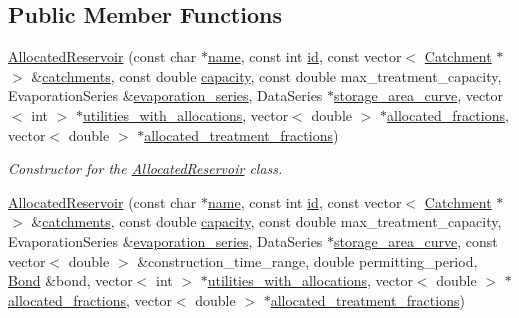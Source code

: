 \subsection*{Public Member Functions}
\begin{DoxyCompactItemize}
\item 
\mbox{\hyperlink{classAllocatedReservoir_a0b2d620a1d1fe9a9fe053269f35a9a70}{Allocated\+Reservoir}} (const char $\ast$\mbox{\hyperlink{classWaterSource_a846ea74c5b453d014f594d41fee8c765}{name}}, const int \mbox{\hyperlink{classWaterSource_a6eafe5dfefd317877d1244e8a7c6e742}{id}}, const vector$<$ \mbox{\hyperlink{classCatchment}{Catchment}} $\ast$$>$ \&\mbox{\hyperlink{classWaterSource_a8c18c34f23f8a06685c1d12f462ed830}{catchments}}, const double \mbox{\hyperlink{classWaterSource_a2ec257b415b248214a8bce7fc5267723}{capacity}}, const double max\+\_\+treatment\+\_\+capacity, Evaporation\+Series \&\mbox{\hyperlink{classReservoir_a2d2d9b302c13703309bb798d24136810}{evaporation\+\_\+series}}, Data\+Series $\ast$\mbox{\hyperlink{classReservoir_a46bd5b750963dfa9a57b247fd77ab8ff}{storage\+\_\+area\+\_\+curve}}, vector$<$ int $>$ $\ast$\mbox{\hyperlink{classWaterSource_ac345583fc2d0f7e1db31ee40244d7ace}{utilities\+\_\+with\+\_\+allocations}}, vector$<$ double $>$ $\ast$\mbox{\hyperlink{classWaterSource_a2f6655a80c4847fe039987255d9d998c}{allocated\+\_\+fractions}}, vector$<$ double $>$ $\ast$\mbox{\hyperlink{classWaterSource_aa73fe10cfc6579b2fb79529e1dde5140}{allocated\+\_\+treatment\+\_\+fractions}})
\begin{DoxyCompactList}\small\item\em Constructor for the \mbox{\hyperlink{classAllocatedReservoir}{Allocated\+Reservoir}} class. \end{DoxyCompactList}\item 
\mbox{\hyperlink{classAllocatedReservoir_a22794afc1f06d13fc3099015a2250b0d}{Allocated\+Reservoir}} (const char $\ast$\mbox{\hyperlink{classWaterSource_a846ea74c5b453d014f594d41fee8c765}{name}}, const int \mbox{\hyperlink{classWaterSource_a6eafe5dfefd317877d1244e8a7c6e742}{id}}, const vector$<$ \mbox{\hyperlink{classCatchment}{Catchment}} $\ast$$>$ \&\mbox{\hyperlink{classWaterSource_a8c18c34f23f8a06685c1d12f462ed830}{catchments}}, const double \mbox{\hyperlink{classWaterSource_a2ec257b415b248214a8bce7fc5267723}{capacity}}, const double max\+\_\+treatment\+\_\+capacity, Evaporation\+Series \&\mbox{\hyperlink{classReservoir_a2d2d9b302c13703309bb798d24136810}{evaporation\+\_\+series}}, Data\+Series $\ast$\mbox{\hyperlink{classReservoir_a46bd5b750963dfa9a57b247fd77ab8ff}{storage\+\_\+area\+\_\+curve}}, const vector$<$ double $>$ \&construction\+\_\+time\+\_\+range, double permitting\+\_\+period, \mbox{\hyperlink{classBond}{Bond}} \&bond, vector$<$ int $>$ $\ast$\mbox{\hyperlink{classWaterSource_ac345583fc2d0f7e1db31ee40244d7ace}{utilities\+\_\+with\+\_\+allocations}}, vector$<$ double $>$ $\ast$\mbox{\hyperlink{classWaterSource_a2f6655a80c4847fe039987255d9d998c}{allocated\+\_\+fractions}}, vector$<$ double $>$ $\ast$\mbox{\hyperlink{classWaterSource_aa73fe10cfc6579b2fb79529e1dde5140}{allocated\+\_\+treatment\+\_\+fractions}})

\end{DoxyCompactItemize}
